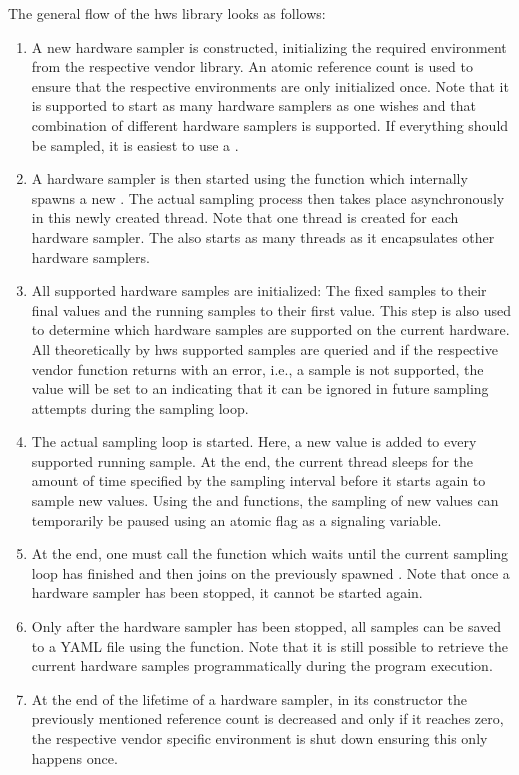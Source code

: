 The general flow of the hws library looks as follows:
\begin{enumerate}
    \item%
    A new hardware sampler is constructed, initializing the required environment from the respective vendor library. 
    An atomic reference count is used to ensure that the respective environments are only initialized once. 
    Note that it is supported to start as many hardware samplers as one wishes and that combination of different hardware samplers is supported. 
    If everything should be sampled, it is easiest to use a .
    \item%
    A hardware sampler is then started using the  function which internally spawns a new . 
    The actual sampling process then takes place asynchronously in this newly created thread. 
    Note that one thread is created for each hardware sampler. 
    The  also starts as many threads as it encapsulates other hardware samplers. 
    \item%
    All supported hardware samples are initialized: The fixed samples to their final values and the running samples to their first value. 
    This step is also used to determine which hardware samples are supported on the current hardware. 
    All theoretically by hws supported samples are queried and if the respective vendor function returns with an error, i.e., a sample is not supported, the value will be set to an  indicating that it can be ignored in future sampling attempts during the sampling loop. 
    \item%
    The actual sampling loop is started. 
    Here, a new value is added to every supported running sample. 
    At the end, the current thread sleeps for the amount of time specified by the sampling interval before it starts again to sample new values. 
    Using the  and  functions, the sampling of new values can temporarily be paused using an atomic flag as a signaling variable. 
    \item%
    At the end, one must call the  function which waits until the current sampling loop has finished and then joins on the previously spawned . 
    Note that once a hardware sampler has been stopped, it cannot be started again. 
    \item%
    Only after the hardware sampler has been stopped, all samples can be saved to a YAML file using the  function. 
    Note that it is still possible to retrieve the current hardware samples programmatically during the program execution.
    \item%
    At the end of the lifetime of a hardware sampler, in its constructor the previously mentioned reference count is decreased and only if it reaches zero, the respective vendor specific environment is shut down ensuring this only happens once. 
\end{enumerate}


